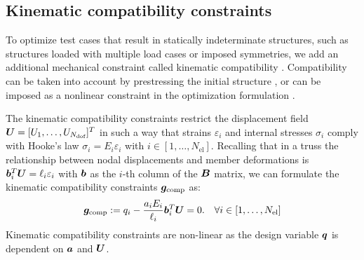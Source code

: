 \subsection{Kinematic compatibility constraints}
To optimize test cases that result in statically indeterminate structures, such as structures loaded with multiple load cases or imposed symmetries, we add an additional mechanical constraint called kinematic compatibility . Compatibility can be taken into account by prestressing the initial structure , or can be imposed as a nonlinear constraint in the optimization formulation .

The kinematic compatibility constraints restrict the displacement field $\bm{U} = [U_1, \ldots,U_{N_{\text{dof}}}]^T$ in such a way that strains $\varepsilon_i$ and internal stresses $\sigma_i$ comply with Hooke's law $\sigma_i = E_i \varepsilon_i$ with $i \in [1,\ldots, N_{\text{el}}]$. Recalling that in a truss the relationship between nodal displacements and member deformations is $\bm{b}^T_i \bm{U} = \ell_i \varepsilon_i$ with $\bm{b}$ as the $i$-th column of the $\bm{B}$ matrix, we can formulate the kinematic compatibility constraints $\bm{g}_{\textrm{comp}}$ as:
\begin{equation}
\label{eq:04_compatib}
\bm{g}_{\textrm{comp}}:=q_i - \frac{a_i E_i}{\ell_i} \bm{b}_i^T\bm{U}  = 0.  \quad \forall i \in [1,\ldots, N_{\text{el}}]
\end{equation}
Kinematic compatibility constraints are non-linear as the design variable $\bm{q}$ is dependent on $\bm{a}$ and $\bm{U}$.


